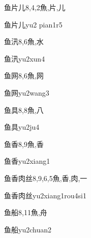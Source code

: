 \begin{Entry}{鱼片儿}{8,4,2}{⿂,⽚,⼉}
  \begin{Phonetics}{鱼片儿}{yu2 pian1r5}
  \end{Phonetics}
\end{Entry}

\begin{Entry}{鱼汛}{8,6}{⿂,⽔}
  \begin{Phonetics}{鱼汛}{yu2xun4}
  \end{Phonetics}
\end{Entry}

\begin{Entry}{鱼网}{8,6}{⿂,⽹}
  \begin{Phonetics}{鱼网}{yu2wang3}
  \end{Phonetics}
\end{Entry}

\begin{Entry}{鱼具}{8,8}{⿂,⼋}
  \begin{Phonetics}{鱼具}{yu2ju4}
  \end{Phonetics}
\end{Entry}

\begin{Entry}{鱼香}{8,9}{⿂,⾹}
  \begin{Phonetics}{鱼香}{yu2xiang1}
  \end{Phonetics}
\end{Entry}

\begin{Entry}{鱼香肉丝}{8,9,6,5}{⿂,⾹,⾁,⼀}
  \begin{Phonetics}{鱼香肉丝}{yu2xiang1rou4si1}
  \end{Phonetics}
\end{Entry}

\begin{Entry}{鱼船}{8,11}{⿂,⾈}
  \begin{Phonetics}{鱼船}{yu2chuan2}
  \end{Phonetics}
\end{Entry}

